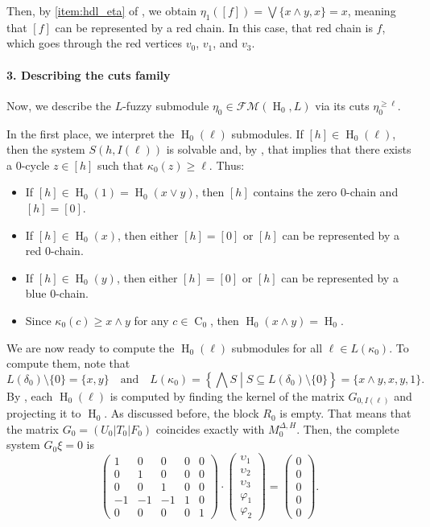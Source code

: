 \documentclass[a4paper,10pt]{article}
\newcommand{\calfm}{\mathcal{F\!M}}
\newcommand{\mdh}{M^{\Delta,H}}
\DeclareMathOperator{\Co}{C}
\DeclareMathOperator{\Ho}{H}
\begin{document}
Then, by \cref{item:hdl_eta} of , we obtain \(\eta_1([f]) = \bigvee \{x \wedge y, x\} = x\), meaning that \([f]\) can be represented by a red chain. In this case, that red chain is \(f\), which goes through the red vertices \(v_0\), \(v_1\), and \(v_3\).

\paragraph{3. Describing the cuts family}
Now, we describe the \(L\)-fuzzy submodule \(\eta_0 \in \calfm(\Ho_0,L)\) via its cuts \(\eta_0^{\geq \ell}\). 

In the first place, we interpret the \(\Ho_0(\ell)\) submodules. If \([h] \in \Ho_0(\ell)\), then the system \(S(h,I(\ell))\) is solvable and, by , that implies that there exists a \(0\)-cycle \(z \in [h]\) such that \(\kappa_0(z) \geq \ell\). Thus:
\begin{itemize}
\item[--] If \([h] \in \Ho_0(1)=\Ho_0(x \vee y)\), then \([h]\) contains the zero \(0\)-chain and \([h]=[0]\).
\item[--] If \([h] \in \Ho_0(x)\), then either \([h]=[0]\) or \([h]\) can be represented by a red \(0\)-chain.
\item[--] If \([h] \in \Ho_0(y)\), then either \([h]=[0]\) or \([h]\) can be represented by a blue \(0\)-chain.
\item[--] Since \(\kappa_0(c) \geq x \wedge y\) for any \(c \in \Co_0\), then \(\Ho_0(x \wedge y)= \Ho_0\).
\end{itemize}
We are now ready to compute the \(\Ho_0(\ell)\) submodules for all \(\ell \in L(\kappa_0)\). To compute them, note that 
\[
L(\delta_0) \setminus \{0\} = \{x,y\} \quad \text{and} \quad L(\kappa_0) = \left\{\bigwedge S \middle | S \subseteq L(\delta_0)\setminus \{0\}\right\}=  \{x\wedge y, x, y, 1\}.
\]
By , each \(\Ho_0(\ell)\) is computed by finding the kernel of the matrix \(G_{0,I(\ell)}\) and projecting it to \(\Ho_0\). As discussed before, the block \(R_0\) is empty. That means that the matrix \(G_0=(U_0|T_0|F_0)\) coincides exactly with \(\mdh_0\). Then, the complete system \(G_0 \xi = 0\) is
\[
\left(
\begin{array}{rrrrr}
 1 &  0 &  0 &  0 &  0 \\ 
 0 &  1 &  0 &  0 &  0 \\ 
 0 &  0 &  1 &  0 &  0 \\ 
-1 & -1 & -1 &  1 &  0 \\ 
 0 &  0 &  0 &  0 &  1
\end{array}
\right) \cdot
\left(\begin{array}{r} \upsilon_1  \\  \upsilon_2  \\  \upsilon_3  \\  \varphi_1  \\  \varphi_2 \end{array}\right) =
\left(\begin{array}{r}0 \\ 0 \\ 0 \\ 0  \\ 0 \end{array}\right).
\]
\end{document}
